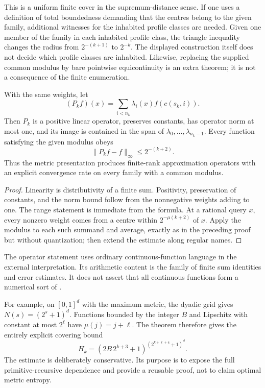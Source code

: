\begin{remark}
This is a uniform finite cover in the supremum-distance sense.  If one
uses a definition of total boundedness demanding that the centres
belong to the given family, additional witnesses for the inhabited
profile classes are needed.  Given one member of the family in each
inhabited profile class, the triangle inequality changes the radius
from $2^{-(k+1)}$ to $2^{-k}$.  The displayed construction itself does
not decide which profile classes are inhabited.
Likewise, replacing the supplied common modulus by bare pointwise
equicontinuity is an extra theorem; it is not a consequence of the
finite enumeration.
\end{remark}

\begin{corollary}
\label{cor:finite-rank}
With the same weights, let
\[
 (P_k f)(x)=\sum_{i<n_k}\lambda_i(x)f(c(s_k,i)).
\]
Then $P_k$ is a positive linear operator, preserves constants, has
operator norm at most one, and its image is contained in the span of
$\lambda_0,\ldots,\lambda_{n_k-1}$.  Every function satisfying the
given modulus obeys
\[
 \|P_k f-f\|_\infty\le 2^{-(k+2)}.
\]
Thus the metric presentation produces finite-rank approximation
operators with an explicit convergence rate on every family with a
common modulus.
\end{corollary}

\begin{proof}
Linearity is distributivity of a finite sum.  Positivity, preservation
of constants, and the norm bound follow from the nonnegative weights
adding to one.  The range statement is immediate from the formula.
At a rational query $x$, every nonzero weight comes from a centre within
$2^{-\mu(k+2)}$ of $x$.  Apply the modulus to each such summand and
average, exactly as in the preceding proof but without quantization;
then extend the estimate along regular names.
\end{proof}

The operator statement uses ordinary continuous-function language in
the external interpretation.  Its arithmetic content is the family
of finite sum identities and error estimates.  It does not assert that
all continuous functions form a numerical sort of \ipra.

For example, on $[0,1]^d$ with the maximum metric, the dyadic grid
gives $N(s)=(2^s+1)^d$.  Functions bounded by the integer $B$ and
Lipschitz with constant at most $2^\ell$ have
$\mu(j)=j+\ell$.  The theorem therefore gives the entirely explicit
covering bound
\[
 H_k=(2B\,2^{k+3}+1)^{(2^{k+\ell+4}+1)^d}.
\]
The estimate is deliberately conservative.  Its purpose is to expose
the full primitive-recursive dependence and provide a reusable proof,
not to claim optimal metric entropy.

